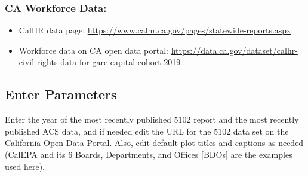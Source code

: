 \documentclass[
]{article}
\begin{document}
\hypertarget{ca-workforce-data}{%
\subsubsection{CA Workforce Data:}\label{ca-workforce-data}}

\begin{itemize}
\item
  CalHR data page:
  \url{https://www.calhr.ca.gov/pages/statewide-reports.aspx}
\item
  Workforce data on CA open data portal:
  \url{https://data.ca.gov/dataset/calhr-civil-rights-data-for-gare-capital-cohort-2019}
\end{itemize}

\hypertarget{enter-parameters}{%
\subsection{Enter Parameters}\label{enter-parameters}}

Enter the year of the most recently published 5102 report and the most
recently published ACS data, and if needed edit the URL for the 5102
data set on the California Open Data Portal. Also, edit default plot
titles and captions as needed (CalEPA and its 6 Boards, Departments, and
Offices {[}BDOs{]} are the examples used here).
\end{document}
